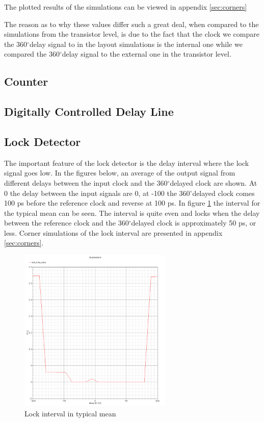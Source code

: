 \documentclass[a4paper,12pt]{article} \usepackage{graphicx}
\newcommand{\degree}{\ensuremath{^\circ}}
\begin{document}
The plotted results of the simulations can be viewed in appendix \ref{sec:corners}

The reason as to why these values differ such a great deal, when compared 
to the simulations from the transistor level, is due to the fact that the 
clock we compare the 360\degree delay signal to in the layout simulations 
is the internal one while we compared the 360\degree delay signal to the 
external one in the transistor level.



\subsection{Counter}
\subsection{Digitally Controlled Delay Line}
\subsection{Lock Detector}
The important feature of the lock detector is the delay interval where
the lock signal goes low. In the figures below, an average of the
output signal from different delays between the input clock and the
360\degree delayed clock are shown. At 0 the delay between the input
signals are 0, at -100 the 360\degree delayed clock comes 100 ps
before the reference clock and reverse at 100 ps. In figure
\ref{fig:LDtm} the interval for the typical mean can be seen. The interval 
is quite even and locks when the delay between the reference
clock and the 360\degree delayed clock is approximately 50 ps, or
less. Corner simulations of the lock interval are presented in
appendix \ref{sec:corners}.

\begin{figure}[h]
  \centering
  \includegraphics[width=0.65\textwidth]{../Bilder/LD_tran/LD_lsim_tm.png}
  \caption{Lock interval in typical mean}
  \label{fig:LDtm}
\end{figure}
\end{document}
